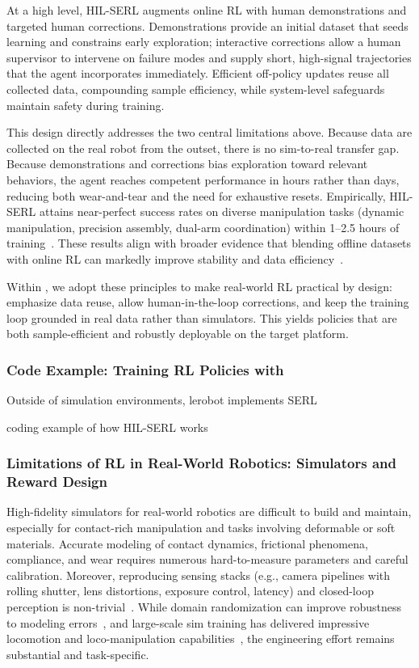 At a high level, HIL-SERL augments online RL with human demonstrations and targeted human corrections. Demonstrations provide an initial dataset that seeds learning and constrains early exploration; interactive corrections allow a human supervisor to intervene on failure modes and supply short, high-signal trajectories that the agent incorporates immediately. Efficient off-policy updates reuse all collected data, compounding sample efficiency, while system-level safeguards maintain safety during training.

This design directly addresses the two central limitations above. Because data are collected on the real robot from the outset, there is no sim-to-real transfer gap. Because demonstrations and corrections bias exploration toward relevant behaviors, the agent reaches competent performance in hours rather than days, reducing both wear-and-tear and the need for exhaustive resets. Empirically, HIL-SERL attains near-perfect success rates on diverse manipulation tasks (dynamic manipulation, precision assembly, dual-arm coordination) within 1--2.5 hours of training~\citep{luoPreciseDexterousRobotic2024}. These results align with broader evidence that blending offline datasets with online RL can markedly improve stability and data efficiency~\citep{ballEfficientOnlineReinforcement2023}.

Within \lerobot, we adopt these principles to make real-world RL practical by design: emphasize data reuse, allow human-in-the-loop corrections, and keep the training loop grounded in real data rather than simulators. This yields policies that are both sample-efficient and robustly deployable on the target platform.

\subsubsection{Code Example: Training RL Policies with \lerobot}
Outside of simulation environments, lerobot implements SERL

coding example of how HIL-SERL works

\subsubsection{Limitations of RL in Real-World Robotics: Simulators and Reward Design}
High-fidelity simulators for real-world robotics are difficult to build and maintain, especially for contact-rich manipulation and tasks involving deformable or soft materials. Accurate modeling of contact dynamics, frictional phenomena, compliance, and wear requires numerous hard-to-measure parameters and careful calibration. Moreover, reproducing sensing stacks (e.g., camera pipelines with rolling shutter, lens distortions, exposure control, latency) and closed-loop perception is non-trivial~\citep{bekrisStateRobotMotion2024,sicilianoSpringerHandbookRobotics2016}. While domain randomization can improve robustness to modeling errors~\citep{openaiSolvingRubiksCube2019}, and large-scale sim training has delivered impressive locomotion and loco-manipulation capabilities~\citep{hwangboLearningAgileDynamic2019,leeLearningQuadrupedalLocomotion2020,jiDribbleBotDynamicLegged2023}, the engineering effort remains substantial and task-specific.

